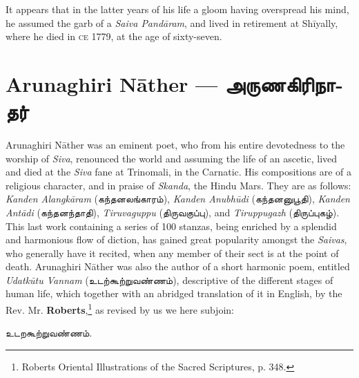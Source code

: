 \documentclass{article}
\newcommand{\TamilText}[1]{\texttamil{#1}}
\newcommand{\TamilBold}[1]{\texttamil{\textbf{#1}}}
\newcommand{\tam}[1]{\TamilText{#1}}
\newcommand{\tambold}[1]{\TamilBold{#1}}
\begin{document}
It appears that in the latter years of his life a gloom having overspread his mind, he assumed the garb of a \emph{Saiva Pand\={a}ram}, and lived in retirement at Sh\={i}yally, where he died in \textsc{ce} 1779, at the age of sixty-seven.

\section{Arunaghiri N\={a}ther --- \tambold{அருணகிரிநாதர்}}
\paragraph{}
Arunaghiri N\={a}ther was an eminent poet, who from his entire devotedness to the worship of \emph{Siva}, renounced the world and assuming the life of an ascetic, lived and died at the \emph{Siva} fane at Trinomali, in the Carnatic. His compositions are of a religious character, and in praise of \emph{Skanda}, the Hindu Mars. They are as follows: \emph{Kanden Alangk\={a}ram} (\tam{கந்தனலங்காரம்}), \emph{Kanden Anubh\={u}di} (\tam{கந்தனனுபூதி}), \emph{Kanden Ant\={a}di} (\tam{கந்தனந்தாதி}), \emph{Tiruvaguppu} (\tam{திருவகுப்பு}), and \emph{Tiruppugazh} (\tam{திருப்புகழ்}). This last work containing a series of 100 stanzas, being enriched by a splendid and harmonious flow of diction, has gained great popularity amongst the \emph{Saivas}, who generally have it recited, when any member of their sect is at the point of death. Arunaghiri N\={a}ther was also the author of a short harmonic poem, entitled \emph{Udatk\={u}tu Vannam} (\tam{உடற்கூற்றுவண்ணம்}), descriptive of the different stages of human life, which together with an abridged translation of it in English, by the Rev. Mr. \textbf{Roberts},\footnote{Roberts Oriental Illustrations of the Sacred Scriptures, p. 348.} as revised by us we here subjoin:
\begin{center}
\tam{உடறகூற்றுவண்ணம்‌}.
\end{center}
\end{document}
